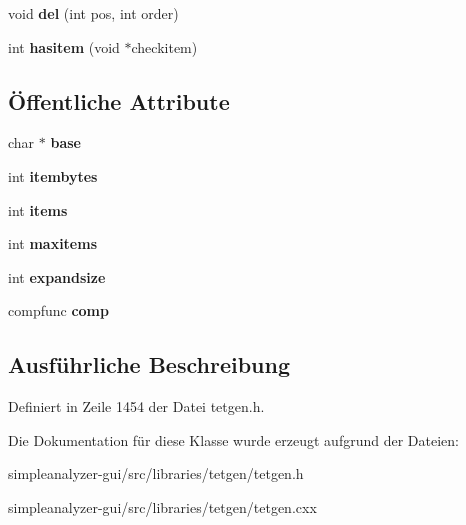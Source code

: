 \begin{DoxyCompactItemize}
\item 
\hypertarget{classtetgenmesh_1_1list_aa51fab5061f47b20636e1b27610811dc}{void {\bfseries del} (int pos, int order)}\label{classtetgenmesh_1_1list_aa51fab5061f47b20636e1b27610811dc}

\item 
\hypertarget{classtetgenmesh_1_1list_a899c167c62eb0bd64721b57e88dafb60}{int {\bfseries hasitem} (void $\ast$checkitem)}\label{classtetgenmesh_1_1list_a899c167c62eb0bd64721b57e88dafb60}

\end{DoxyCompactItemize}
\subsection*{Öffentliche Attribute}
\begin{DoxyCompactItemize}
\item 
\hypertarget{classtetgenmesh_1_1list_a5acf3b77fb5bd56db298971a647e8b5f}{char $\ast$ {\bfseries base}}\label{classtetgenmesh_1_1list_a5acf3b77fb5bd56db298971a647e8b5f}

\item 
\hypertarget{classtetgenmesh_1_1list_af9e6a5ea310f356f8f1255e0ec46d4b5}{int {\bfseries itembytes}}\label{classtetgenmesh_1_1list_af9e6a5ea310f356f8f1255e0ec46d4b5}

\item 
\hypertarget{classtetgenmesh_1_1list_a9114b463c08134a9801f3ddd5c81e5dc}{int {\bfseries items}}\label{classtetgenmesh_1_1list_a9114b463c08134a9801f3ddd5c81e5dc}

\item 
\hypertarget{classtetgenmesh_1_1list_a54c292508710e9a9c37e3722abcdebb5}{int {\bfseries maxitems}}\label{classtetgenmesh_1_1list_a54c292508710e9a9c37e3722abcdebb5}

\item 
\hypertarget{classtetgenmesh_1_1list_a38fed151924f61588cefdbfc16bf0bdd}{int {\bfseries expandsize}}\label{classtetgenmesh_1_1list_a38fed151924f61588cefdbfc16bf0bdd}

\item 
\hypertarget{classtetgenmesh_1_1list_a05f1c3fd04145d59828bced84ae34000}{compfunc {\bfseries comp}}\label{classtetgenmesh_1_1list_a05f1c3fd04145d59828bced84ae34000}

\end{DoxyCompactItemize}


\subsection{Ausführliche Beschreibung}


Definiert in Zeile 1454 der Datei tetgen.\-h.



Die Dokumentation für diese Klasse wurde erzeugt aufgrund der Dateien\-:\begin{DoxyCompactItemize}
\item 
simpleanalyzer-\/gui/src/libraries/tetgen/tetgen.\-h\item 
simpleanalyzer-\/gui/src/libraries/tetgen/tetgen.\-cxx\end{DoxyCompactItemize}
